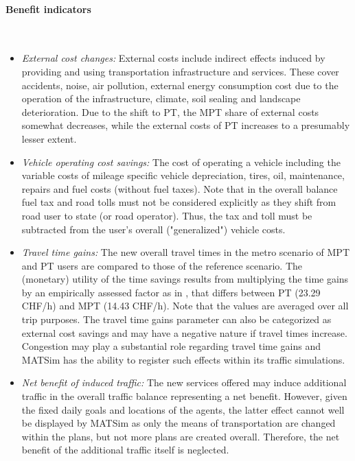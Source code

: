 \paragraph{Benefit indicators}\mbox{}\\[-5ex]
\begin{itemize}
	\item \textit{External cost changes:} External costs include indirect effects induced by providing and using transportation infrastructure and services. These cover accidents, noise, air pollution, external energy consumption cost due to the operation of the infrastructure, climate, soil sealing and landscape deterioration. Due to the shift to PT, the MPT share of external costs somewhat decreases, while the external costs of PT increases to a presumably lesser extent.
	\item \textit{Vehicle operating cost savings:} The cost of operating a vehicle including the variable costs of mileage specific vehicle depreciation, tires, oil, maintenance, repairs and fuel costs (without fuel taxes). Note that in the overall balance fuel tax and road tolls must not be considered explicitly as they shift from road user to state (or road operator). Thus, the tax and toll must be subtracted from the user's overall ("generalized") vehicle costs.
	\item \textit{Travel time gains:} The new overall travel times in the metro scenario of MPT and PT users are compared to those of the reference scenario. The (monetary) utility of the time savings results from multiplying the time gains by an empirically assessed factor as in \citet{VSS_Norm_KNA6418227_2009Own}, that differs between PT (23.29 CHF/h) and MPT (14.43 CHF/h). Note that the values are averaged over all trip purposes. The travel time gains parameter can also be categorized as external cost savings and may have a negative nature if travel times increase. Congestion may play a substantial role regarding travel time gains and MATSim has the ability to register such effects within its traffic simulations. 
	\item \textit{Net benefit of induced traffic:} The new services offered may induce additional traffic in the overall traffic balance representing a net benefit. However, given the fixed daily goals and locations of the agents, the latter effect cannot well be displayed by MATSim as only the means of transportation are changed within the plans, but not more plans are created overall. Therefore, the net benefit of the additional traffic itself is neglected.
\end{itemize}

